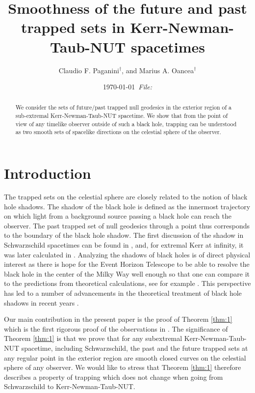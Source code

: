 \documentclass[reqno]{amsart}
\title{Smoothness of the future and past trapped sets in Kerr-Newman-Taub-NUT spacetimes}
\author[C.~F. Paganini and M.~A. Oancea]{ Claudio F. Paganini$^\dagger$,   and Marius A. Oancea$^\dagger$}
\numberwithin{equation}{section}
\theoremstyle{plain}
\theoremstyle{definition}
\begin{document}
\date{\today \ {\em File:}}

\begin{abstract}
We consider the sets of future/past trapped null geodesics in the exterior region of a sub-extremal Kerr-Newman-Taub-NUT spacetime. We show that from the point of view of any timelike observer outside of such a black hole, trapping can be understood as two smooth sets of spacelike directions on the celestial sphere of the observer.
\end{abstract}



\maketitle


\tableofcontents



\section{Introduction}The trapped sets on the celestial sphere are closely related to the notion of black hole shadows. The shadow of the black hole is defined as the innermost trajectory on which light from a background source passing a black hole can reach the observer. The past trapped set of null geodesics through a point thus corresponds to the boundary of the black hole shadow. The first discussion of the shadow in Schwarzschild spacetimes can be found in \cite{synge_escape_1966}, and, for extremal Kerr at infinity, it was later calculated in \cite{bardeen_black_1973}. Analyzing the shadows of black holes is of direct physical interest as there is hope for the Event Horizon Telescope to be able to resolve the black hole in the center of the Milky Way well enough so that one can compare it to the predictions from theoretical calculations, see for example \cite{doeleman_event-horizon-scale_2008}. This perspective has led to a number of advancements in the theoretical treatment of black hole shadows in recent years \cite{cunha_shadows_2016,grenzebach_aberrational_2015,grenzebach_photon_2014,grenzebach_photon_2015,hioki_measurement_2009,li_measuring_2014}. 

Our main contribution in the present paper is the proof of Theorem \ref{thm:1} which is the first rigorous proof of the observations in \cite{grenzebach_photon_2014}. The significance of Theorem \ref{thm:1} is that we prove that for any subextremal Kerr-Newman-Taub-NUT spacetime, including Schwarzschild, the past and the future trapped sets at any regular point in the exterior region are smooth closed curves on the celestial sphere of any observer. We would like to stress that Theorem \ref{thm:1} therefore describes a property of trapping which does not change when going from Schwarzschild to Kerr-Newman-Taub-NUT.
\end{document}
